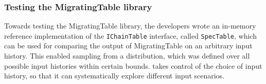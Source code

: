 \subsubsection{Testing the MigratingTable library}

Towards testing the MigratingTable library, the developers wrote an in-memory reference implementation of the \texttt{IChainTable} interface, called \texttt{SpecTable}, which can be used for comparing the output of MigratingTable on an arbitrary input history. This enabled sampling from a distribution, which was defined over all possible input histories within certain bounds. \psharp takes control of the choice of input history, so that it can systematically explore different input scenarios.





